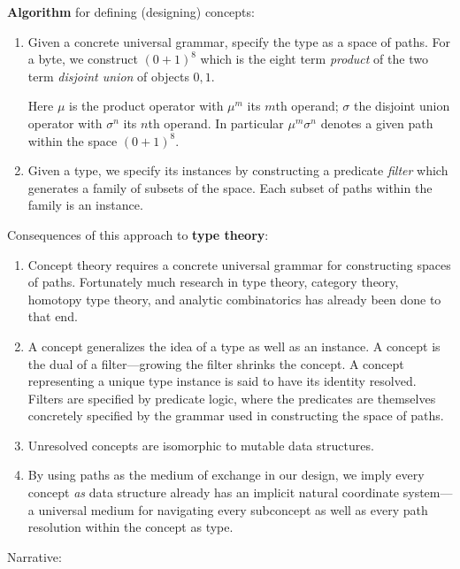 \documentclass[twoside]{article}
\begin{document}
{\bf Algorithm} for defining (designing) concepts:

\begin{enumerate}
\item Given a concrete universal grammar, specify the type as a space of paths. For a byte,
      we construct $ (0+1)^8 $ which is the eight term \emph{product} of the two term \emph{disjoint union} of objects $ 0, 1 $.

      Here $ \mu $ is the product operator with $ \mu^m $ its $ m $th operand; $ \sigma $ the disjoint union operator
      with $ \sigma^n $ its $ n $th operand. In particular $ \mu^m\sigma^n $ denotes a given path within the space $ (0+1)^8 $.
\item Given a type, we specify its instances by constructing a predicate \emph{filter} which generates a family of subsets
      of the space. Each subset of paths within the family is an instance.
\end{enumerate}

Consequences of this approach to {\bf type theory}:

\begin{enumerate}
\item Concept theory requires a concrete universal grammar for constructing spaces of paths. Fortunately much research
      in type theory, category theory, homotopy type theory, and analytic combinatorics has already been done to that end.
\item A concept generalizes the idea of a type as well as an instance. A concept is the dual of a filter---growing the filter
      shrinks the concept. A concept representing a unique type instance is said to have its identity resolved. Filters are
      specified by predicate logic, where the predicates are themselves concretely specified by the grammar used in constructing
      the space of paths.
\item Unresolved concepts are isomorphic to mutable data structures.
\item By using paths as the medium of exchange in our design, we imply every concept \emph{as} data structure already has an
      implicit natural coordinate system---a universal medium for navigating every subconcept as well as every path resolution
      within the concept as type.
\end{enumerate}

Narrative:
\end{document}
